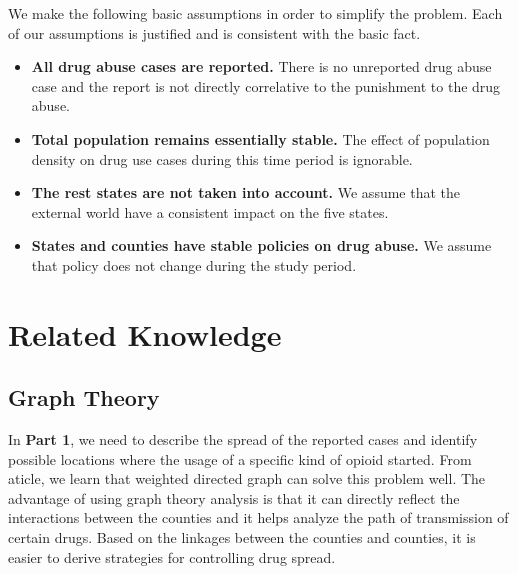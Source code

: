\documentclass{mcmthesis}
\begin{document}
We make the following basic assumptions in order to simplify the problem. Each of our assumptions is justified and is consistent with the basic fact.
\begin{itemize}
	\item \textbf{All drug abuse cases are reported.} There is no unreported drug abuse case and the report is not directly correlative to the punishment to the drug abuse.
	\item \textbf{Total population remains essentially stable.} The effect of population density on drug use cases during this time period is ignorable.
	\item \textbf{The rest states are not taken into account.} We assume that the external world have a consistent impact on the five states.
	\item \textbf{States and counties have stable policies on drug abuse.} We assume that policy does not change during the study period.
\end{itemize}

\section{Related Knowledge}

\subsection*{Graph Theory}
In \textbf{Part 1}, we need to describe the spread of the reported cases and identify possible locations where the usage of a specific kind of opioid started. From aticle\cite{2}, we learn that weighted directed graph can solve this problem well. The advantage of using graph theory analysis is that it can directly reflect the interactions between the counties and it helps analyze the path of transmission of certain drugs. Based on the linkages between the counties and counties, it is easier to derive strategies for controlling drug spread.
\end{document}
